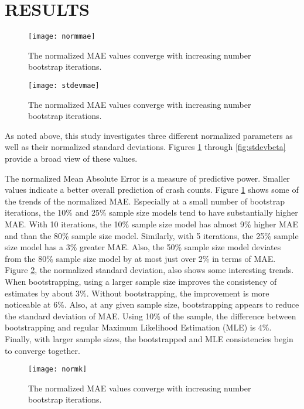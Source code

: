 \documentclass[titlepage,12pt,times,nopageno]{article}
\begin{document}
\section*{\label{sec:results}\normalsize RESULTS}
\begin{figure}[t]
\centering
  \captionnamefont{\bfseries}
  \captiontitlefont{\normalsize \bfseries}
  \captiondelim{ }
  \renewcommand{\figurename}{FIGURE}
\texttt{[image: normmae]}
	\caption{The normalized MAE values converge with increasing number bootstrap iterations.}
	\label{fig:normmae}
\end{figure}
\begin{figure}[ht]
\centering
  \captionnamefont{\bfseries}
  \captiontitlefont{\normalsize \bfseries}
  \captiondelim{ }
  \renewcommand{\figurename}{FIGURE}
\texttt{[image: stdevmae]}
	\caption{The normalized MAE values converge with increasing number bootstrap iterations.}
	\label{fig:stdevmae}
\end{figure}
As noted above, this study investigates three different normalized parameters as well as their normalized standard deviations.  Figures \ref{fig:normmae} through \ref{fig:stdevbeta} provide a broad view of these values.\par
The normalized Mean Absolute Error is a measure of predictive power.  Smaller values indicate a better overall prediction of crash counts.  Figure \ref{fig:normmae} shows some of the trends of the normalized MAE.  Especially at a small number of bootstrap iterations, the 10\% and 25\% sample size models tend to have substantially higher MAE.  With 10 iterations, the 10\% sample size model has almost 9\% higher MAE and than the 80\% sample size model.  Similarly, with 5 iterations, the 25\% sample size model has a 3\% greater MAE.  Also, the 50\% sample size model deviates from the 80\% sample size model by at most just over 2\% in terms of MAE.  Figure \ref{fig:stdevmae}, the normalized standard deviation, also shows some interesting trends.  When bootstrapping, using a larger sample size improves the consistency of estimates by about 3\%.  Without bootstrapping, the improvement is more noticeable at 6\%.  Also, at any given sample size, bootstrapping appears to reduce the standard deviation of MAE.  Using 10\% of the sample, the difference between bootstrapping and regular Maximum Likelihood Estimation (MLE) is 4\%.  Finally, with larger sample sizes, the bootstrapped and MLE consistencies begin to converge together.\par
\begin{figure}[h]
\centering
  \captionnamefont{\bfseries}
  \captiontitlefont{\normalsize \bfseries}
  \captiondelim{ }
  \renewcommand{\figurename}{FIGURE}
\texttt{[image: normk]}
	\caption{The normalized MAE values converge with increasing number bootstrap iterations.}
	\label{fig:normk}
\end{figure}
\end{document}
